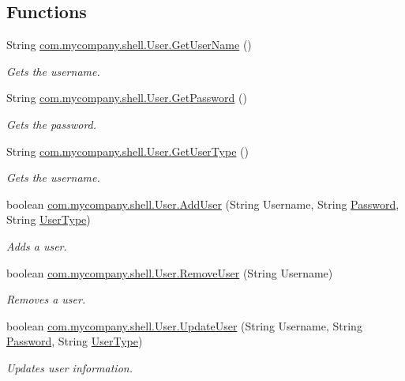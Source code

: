 \subsection*{Functions}
\begin{DoxyCompactItemize}
\item 
String \hyperlink{group__TechnicalDetails_ga7a04eb11e9e107366bf95862e5516aec}{com.\+mycompany.\+shell.\+User.\+Get\+User\+Name} ()
\begin{DoxyCompactList}\small\item\em Gets the username. \end{DoxyCompactList}\item 
String \hyperlink{group__TechnicalDetails_ga2fd008e836a8968a40bf5f0b8b02cfa2}{com.\+mycompany.\+shell.\+User.\+Get\+Password} ()
\begin{DoxyCompactList}\small\item\em Gets the password. \end{DoxyCompactList}\item 
String \hyperlink{group__TechnicalDetails_gaba3042d4abc0586fdb28bc7692ad300d}{com.\+mycompany.\+shell.\+User.\+Get\+User\+Type} ()
\begin{DoxyCompactList}\small\item\em Gets the username. \end{DoxyCompactList}\item 
boolean \hyperlink{group__TechnicalDetails_ga6fdcc50f5df5e2a409d9a5bb0ae2f4f3}{com.\+mycompany.\+shell.\+User.\+Add\+User} (String Username, String \hyperlink{classcom_1_1mycompany_1_1shell_1_1User_a97addebba6620b23c6ad9a74cc2d4d97}{Password}, String \hyperlink{classcom_1_1mycompany_1_1shell_1_1User_a7adda82096915c29abc7abdfd999d24d}{User\+Type})
\begin{DoxyCompactList}\small\item\em Adds a user. \end{DoxyCompactList}\item 
boolean \hyperlink{group__TechnicalDetails_ga87fcb60481678e35850283b557bba02d}{com.\+mycompany.\+shell.\+User.\+Remove\+User} (String Username)
\begin{DoxyCompactList}\small\item\em Removes a user. \end{DoxyCompactList}\item 
boolean \hyperlink{group__TechnicalDetails_ga5b408be81e56874edbb63c3e41676758}{com.\+mycompany.\+shell.\+User.\+Update\+User} (String Username, String \hyperlink{classcom_1_1mycompany_1_1shell_1_1User_a97addebba6620b23c6ad9a74cc2d4d97}{Password}, String \hyperlink{classcom_1_1mycompany_1_1shell_1_1User_a7adda82096915c29abc7abdfd999d24d}{User\+Type})
\begin{DoxyCompactList}\small\item\em Updates user information. \end{DoxyCompactList}\end{DoxyCompactItemize}


